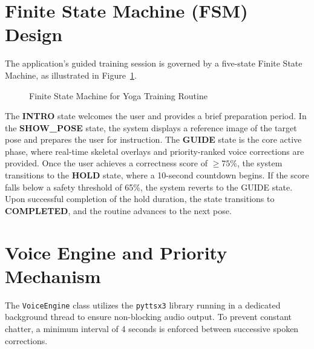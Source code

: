 \section{Finite State Machine (FSM) Design}
The application's guided training session is governed by a five-state Finite State Machine, as illustrated in Figure~\ref{fig:fsm_diagram}.

\begin{figure}[H]
    \centering
    \caption{Finite State Machine for Yoga Training Routine}
    \label{fig:fsm_diagram}
\end{figure}

The \textbf{INTRO} state welcomes the user and provides a brief preparation period. In the \textbf{SHOW\_POSE} state, the system displays a reference image of the target pose and prepares the user for instruction. The \textbf{GUIDE} state is the core active phase, where real-time skeletal overlays and priority-ranked voice corrections are provided. Once the user achieves a correctness score of $\geq 75\%$, the system transitions to the \textbf{HOLD} state, where a 10-second countdown begins. If the score falls below a safety threshold of 65\%, the system reverts to the GUIDE state. Upon successful completion of the hold duration, the state transitions to \textbf{COMPLETED}, and the routine advances to the next pose.

\section{Voice Engine and Priority Mechanism}
The \texttt{VoiceEngine} class utilizes the \texttt{pyttsx3} library running in a dedicated background thread to ensure non-blocking audio output. To prevent constant chatter, a minimum interval of 4 seconds is enforced between successive spoken corrections.


